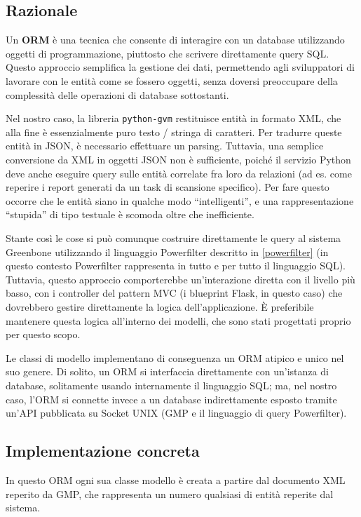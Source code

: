 \subsection{Razionale}
Un \textbf{ORM} è una tecnica che consente di interagire con un database utilizzando oggetti di programmazione, piuttosto che scrivere direttamente query SQL. Questo approccio semplifica la gestione dei dati, permettendo agli sviluppatori di lavorare con le entità come se fossero oggetti, senza doversi preoccupare della complessità delle operazioni di database sottostanti.

Nel nostro caso, la libreria \texttt{python-gvm} restituisce entità in formato XML, che alla fine è essenzialmente puro testo / stringa di caratteri. Per tradurre queste entità in JSON, è necessario effettuare un parsing. Tuttavia, una semplice conversione da XML in oggetti JSON non è sufficiente, poiché il servizio Python deve anche eseguire query sulle entità correlate fra loro da relazioni (ad es. come reperire i report generati da un task di scansione specifico). Per fare questo occorre che le entità siano in qualche modo ``intelligenti'', e una rappresentazione ``stupida'' di tipo testuale è scomoda oltre che inefficiente.

Stante così le cose si può comunque costruire direttamente le query al sistema Greenbone utilizzando il linguaggio Powerfilter descritto in \ref{powerfilter} (in questo contesto Powerfilter rappresenta in tutto e per tutto il linguaggio SQL). Tuttavia, questo approccio comporterebbe un'interazione diretta con il livello più basso, con i controller del pattern MVC (i blueprint Flask, in questo caso) che dovrebbero gestire direttamente la logica dell'applicazione. È preferibile mantenere questa logica all'interno dei modelli, che sono stati progettati proprio per questo scopo.

Le classi di modello implementano di conseguenza un ORM atipico e unico nel suo genere. Di solito, un ORM si interfaccia direttamente con un'istanza di database, solitamente usando internamente il linguaggio SQL; ma, nel nostro caso, l'ORM si connette invece a un database indirettamente esposto tramite un'API pubblicata su Socket UNIX (GMP e il linguaggio di query Powerfilter).

\subsection{Implementazione concreta}
In questo ORM ogni sua classe modello è creata a partire dal documento XML reperito da GMP, che rappresenta un numero qualsiasi di entità reperite dal sistema.

